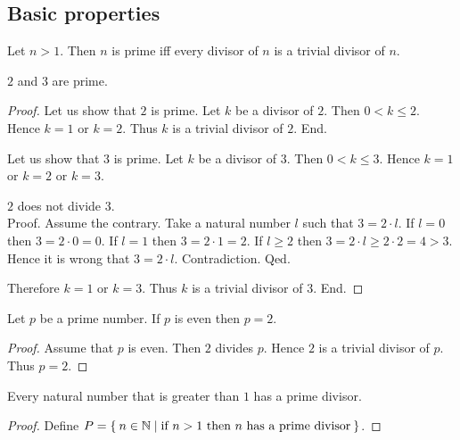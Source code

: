 \documentclass[../../natural-numbers.ftl.tex]{subfiles}
\begin{document}
  \subsection{Basic properties}

  \begin{forthel}
    \begin{proposition}\label{Arithmetic_03_04_357744}
      Let $n > 1$.
      Then $n$ is prime iff every divisor of $n$ is a trivial divisor of $n$.
    \end{proposition}

    \begin{proposition}\label{Arithmetic_03_04_175431}
      $2$ and $3$ are prime.
    \end{proposition}
    \begin{proof}
      Let us show that $2$ is prime.
        Let $k$ be a divisor of $2$.
        Then $0 < k \leq 2$.
        Hence $k = 1$ or $k = 2$.
        Thus $k$ is a trivial divisor of $2$.
      End.

      Let us show that $3$ is prime.
        Let $k$ be a divisor of $3$.
        Then $0 < k \leq 3$.
        Hence $k = 1$ or $k = 2$ or $k = 3$.

        $2$ does not divide $3$. \\
        Proof.
          Assume the contrary.
          Take a natural number $l$ such that $3 = 2 \cdot l$.
          If $l = 0$ then $3 = 2 \cdot 0 = 0$.
          If $l = 1$ then $3 = 2 \cdot 1 = 2$.
          If $l \geq 2$ then $3 = 2 \cdot l \geq 2 \cdot 2 = 4 > 3$.
          Hence it is wrong that $3 = 2 \cdot l$.
          Contradiction.
        Qed.

        Therefore $k = 1$ or $k = 3$.
        Thus $k$ is a trivial divisor of $3$.
      End.
    \end{proof}

    \begin{proposition}\label{Arithmetic_03_04_520376}
      Let $p$ be a prime number.
      If $p$ is even then $p = 2$.
    \end{proposition}
    \begin{proof}
      Assume that $p$ is even.
      Then $2$ divides $p$.
      Hence $2$ is a trivial divisor of $p$.
      Thus $p = 2$.
    \end{proof}

    \begin{proposition}\label{Arithmetic_03_04_130748}
      Every natural number that is greater than $1$ has a prime divisor.
    \end{proposition}
    \begin{proof}
      Define $P = \Set{n \in \mathbb{N} | \text{if $n > 1$ then $n$ has a prime divisor}}$.


\end{proof}
\end{forthel}
\end{document}
